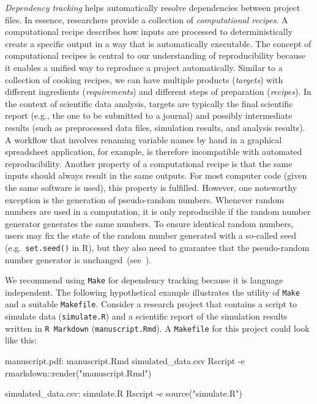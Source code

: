 \documentclass[psych,tutorial,accept,moreauthors,pdftex]{Definitions/mdpi}
\newenvironment{Shaded}{\begin{snugshade}}{\end{snugshade}}
\newcommand{\AttributeTok}[1]{\textcolor[rgb]{0.77,0.63,0.00}{#1}}
\newcommand{\ExtensionTok}[1]{#1}
\newcommand{\NormalTok}[1]{#1}
\newcommand{\StringTok}[1]{\textcolor[rgb]{0.31,0.60,0.02}{#1}}
\begin{document}
\emph{Dependency tracking} helps automatically resolve dependencies
between project files. In essence, researchers provide a collection of
\emph{computational recipes}. A computational recipe describes how
inputs are processed to deterministically create a specific output in a
way that is automatically executable. The concept of computational
recipes is central to our understanding of reproducibility because it
enables a unified way to reproduce a project automatically. Similar to a
collection of cooking recipes, we can have multiple products
(\emph{targets}) with different ingredients (\emph{requirements}) and
different steps of preparation (\emph{recipes}). In the context of
scientific data analysis, targets are typically the final scientific
report (e.g., the one to be submitted to a journal) and possibly
intermediate results (such as preprocessed data files, simulation
results, and analysis results). A workflow that involves renaming
variable names by hand in a graphical spreadsheet application, for
example, is therefore incompatible with automated reproducibility.
Another property of a computational recipe is that the same inputs
should always result in the same outputs. For most computer code (given
the same software is used), this property is fulfilled. However, one
noteworthy exception is the generation of pseudo-random numbers.
Whenever random numbers are used in a computation, it is only
reproducible if the random number generator generates the same numbers.
To ensure identical random numbers, users may fix the state of the
random number generated with a so-called seed (e.g.~\texttt{set.seed()}
in R), but they also need to guarantee that the pseudo-random number
generator is unchanged~(see~\citep{Peikert2019}).

We recommend using \texttt{Make} for dependency tracking because it is
language independent. The following hypothetical example illustrates the
utility of \texttt{Make} and a suitable \texttt{Makefile}. Consider a
research project that contains a script to simulate data
(\texttt{simulate.R}) and a scientific report of the simulation results
written in \texttt{R\ Markdown} (\texttt{manuscript.Rmd}). A
\texttt{Makefile} for this project could look like this:



\begin{adjustwidth}{0.5cm}{0cm} 
\begin{Shaded}
\begin{Highlighting}[]
\ExtensionTok{manuscript.pdf:}\NormalTok{ manuscript.Rmd simulated\_data.csv}
  \ExtensionTok{Rscript} \AttributeTok{{-}e} \StringTok{\textquotesingle{}rmarkdown::render("manuscript.Rmd")\textquotesingle{}}

\ExtensionTok{simulated\_data.csv:}\NormalTok{ simulate.R}
  \ExtensionTok{Rscript} \AttributeTok{{-}e} \StringTok{\textquotesingle{}source("simulate.R")\textquotesingle{}}
\end{Highlighting}
\end{Shaded}
\end{adjustwidth}
\end{document}
